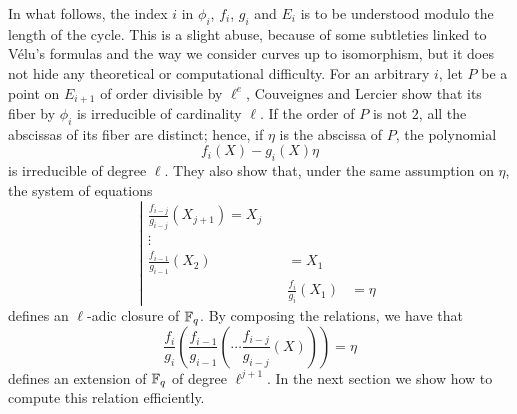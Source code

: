 \documentclass{sig-alternate}
\begin{document}
In what follows, the index $i$ in $\phi_i$, $f_i$, $g_i$ and $E_i$ is
to be understood modulo the length of the cycle. This is a slight
abuse, because of some subtleties linked to Vélu's formulas and the
way we consider curves up to isomorphism, but it does not hide any
theoretical or computational difficulty.  For an arbitrary $i$, let
$P$ be a point on $E_{i+1}$ of order divisible by $\ell^e$, Couveignes
and Lercier show that its fiber by $\phi_i$ is irreducible of
cardinality $\ell$. If the order of $P$ is not $2$, all the abscissas
of its fiber are distinct; hence, if $\eta$ is the abscissa of $P$,
the polynomial
\begin{equation}
  \label{eq:isog-fiber}
  f_i(X) - g_i(X)\eta
\end{equation}
is irreducible of degree $\ell$. They also show that, under the same
assumption on $\eta$, the system of equations
\begin{equation}
  \label{eq:elliptic}
  \left|
  \begin{aligned}
    \textstyle
    \frac{f_{i-j}}{g_{i-j}}(X_{j+1}) = X_j\quad\\
    \vdots\qquad\\
    \textstyle
    \frac{f_{i-1}}{g_{i-1}}(X_2) &= X_1\\
              &\textstyle\frac{f_i}{g_i}(X_1) &= \eta
  \end{aligned}
  \right.
\end{equation}
defines an $\ell$-adic closure of $\mathbb{F}_q$. By composing the relations,
we have that
\begin{equation}
  \label{eq:elliptic-uni}
  \frac{f_i}{g_i}\left(\frac{f_{i-1}}{g_{i-1}}\left(\cdots\frac{f_{i-j}}{g_{i-j}}(X)\right)\right) = \eta
\end{equation}
defines an extension of $\mathbb{F}_q$ of degree $\ell^{j+1}$. In the next
section we show how to compute this relation efficiently.
\end{document}
